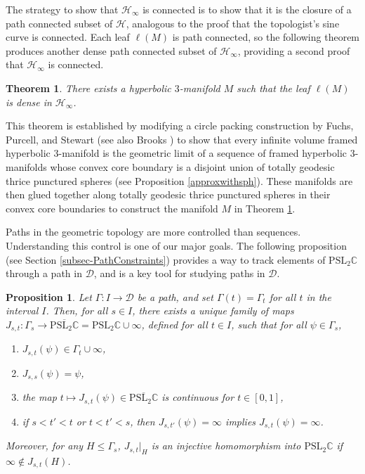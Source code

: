 \documentclass[11pt,leqno]{article}
\newtheorem{introtheorem}{Theorem}
\newtheorem*{prop*}{Proposition}
\theoremstyle{introdef}
\numberwithin{lemma}{section}
\theoremstyle{definition}
\newcommand{\C}{\mathbb{C}}
\begin{document}
The strategy to show that $\mathcal{H}_\infty$ is connected is to show that it is the closure of a path connected subset of $\mathcal{H}$, analogous to the proof that the topologist's sine curve is connected. Each leaf $\ell(M)$ is path connected, so the following theorem produces another dense path connected subset of $\mathcal{H}_\infty$, providing a second proof that $\mathcal{H}_\infty$ is connected.

\begin{introtheorem}
\label{introthm-denseleaf}
    There exists a hyperbolic $3$-manifold $M$ such that the leaf $\ell(M)$ is dense in $\mathcal{H}_\infty$.
\end{introtheorem}

This theorem is established by modifying a circle packing construction by Fuchs, Purcell, and Stewart \cite{PUR} (see also Brooks \cite{BRO}) to show that every infinite volume framed hyperbolic $3$-manifold is the geometric limit of a sequence of framed hyperbolic $3$-manifolds whose convex core boundary is a disjoint union of totally geodesic thrice punctured spheres (see Proposition \ref{approxwithsph}). These manifolds are then glued together along totally geodesic thrice punctured spheres in their convex core boundaries to construct the manifold $M$ in Theorem \ref{introthm-denseleaf}.\par

Paths in the geometric topology are more controlled than sequences. Understanding this control is one of our major goals. The following proposition (see Section \ref{subsec-PathConstraints}) provides a way to track elements of $\mathrm{PSL}_2\C$ through a path in $\mathcal{D}$, and is a key tool for studying paths in $\mathcal{D}$.

\begin{prop*}
    \label{introprop-JMaps}
    Let $\Gamma:I\rightarrow\mathcal{D}$ be a path, and set $\Gamma(t)=\Gamma_t$ for all $t$ in the interval $I$. Then, for all $s\in I$, there exists a unique family of maps $J_{s,t}:\Gamma_s\rightarrow\overline{\mathrm{PSL}_2\C}=\mathrm{PSL}_2\C\cup\infty$, defined for all $t\in I$, such that for all $\psi\in\Gamma_s$,
    \begin{enumerate}
        \item $J_{s,t}(\psi)\in\Gamma_t\cup\infty$,
        \item $J_{s,s}(\psi)=\psi$,
        \item the map $t\mapsto J_{s,t}(\psi)\in\overline{\mathrm{PSL}_2\C}$ is continuous for $t\in[0,1]$,
        \item if $s<t'<t$ or $t<t'<s$, then $J_{s,t'}(\psi)=\infty$ implies $J_{s,t}(\psi)=\infty$.
    \end{enumerate}
    Moreover, for any $H\leq\Gamma_s$, $J_{s,t}|_H$ is an injective homomorphism into $\mathrm{PSL}_2\C$ if $\infty\not\in J_{s,t}(H)$.
\end{prop*}
\end{document}
